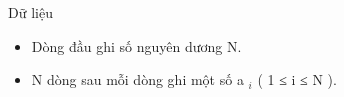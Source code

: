 Dữ liệu
\begin{itemize}
	\item     Dòng đầu ghi số nguyên dương N.   
	\item     N dòng sau mỗi dòng ghi một số a    $_     i    $    ( 1 ≤ i ≤ N ).   
\end{itemize}